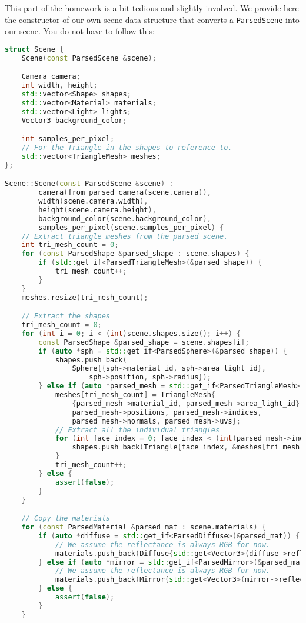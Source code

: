 This part of the homework is a bit tedious and slightly involved. We provide here the constructor of our own scene data structure that converts a \lstinline{ParsedScene} into our scene. You do not have to follow this:
\begin{lstlisting}[language=C++]
struct Scene {
    Scene(const ParsedScene &scene);

    Camera camera;
    int width, height;
    std::vector<Shape> shapes;
    std::vector<Material> materials;
    std::vector<Light> lights;
    Vector3 background_color;

    int samples_per_pixel;
    // For the Triangle in the shapes to reference to.
    std::vector<TriangleMesh> meshes;
};

Scene::Scene(const ParsedScene &scene) :
        camera(from_parsed_camera(scene.camera)),
        width(scene.camera.width),
        height(scene.camera.height),
        background_color(scene.background_color),
        samples_per_pixel(scene.samples_per_pixel) {
    // Extract triangle meshes from the parsed scene.
    int tri_mesh_count = 0;
    for (const ParsedShape &parsed_shape : scene.shapes) {
        if (std::get_if<ParsedTriangleMesh>(&parsed_shape)) {
            tri_mesh_count++;
        }
    }
    meshes.resize(tri_mesh_count);

    // Extract the shapes
    tri_mesh_count = 0;
    for (int i = 0; i < (int)scene.shapes.size(); i++) {
        const ParsedShape &parsed_shape = scene.shapes[i];
        if (auto *sph = std::get_if<ParsedSphere>(&parsed_shape)) {
            shapes.push_back(
                Sphere{{sph->material_id, sph->area_light_id},
                    sph->position, sph->radius});
        } else if (auto *parsed_mesh = std::get_if<ParsedTriangleMesh>(&parsed_shape)) {
            meshes[tri_mesh_count] = TriangleMesh{
                {parsed_mesh->material_id, parsed_mesh->area_light_id},
                parsed_mesh->positions, parsed_mesh->indices,
                parsed_mesh->normals, parsed_mesh->uvs};
            // Extract all the individual triangles
            for (int face_index = 0; face_index < (int)parsed_mesh->indices.size(); face_index++) {
                shapes.push_back(Triangle{face_index, &meshes[tri_mesh_count]});
            }
            tri_mesh_count++;
        } else {
            assert(false);
        }
    }

    // Copy the materials
    for (const ParsedMaterial &parsed_mat : scene.materials) {
        if (auto *diffuse = std::get_if<ParsedDiffuse>(&parsed_mat)) {
            // We assume the reflectance is always RGB for now.
            materials.push_back(Diffuse{std::get<Vector3>(diffuse->reflectance)});
        } else if (auto *mirror = std::get_if<ParsedMirror>(&parsed_mat)) {
            // We assume the reflectance is always RGB for now.
            materials.push_back(Mirror{std::get<Vector3>(mirror->reflectance)});
        } else {
            assert(false);
        }
    }


\end{lstlisting}

